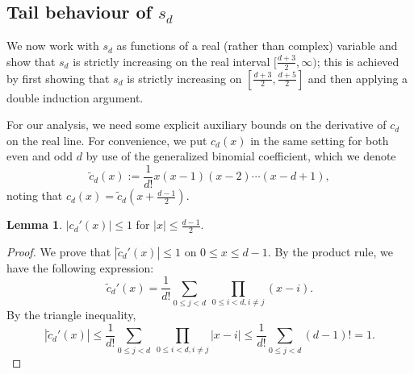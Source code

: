 \documentclass[12pt]{amsart}
\theoremstyle{definition}
\newtheorem{lemma}[theorem]{Lemma}
\begin{document}
\subsection{Tail behaviour of $s_d$}
We now work with $s_d$ as functions of a real (rather than complex) variable and show that $s_d$ is strictly increasing on the real interval $[\frac{d+3}{2},\infty)$; this is achieved by first showing that $s_d$ is strictly increasing on $[\frac{d+3}{2},\frac{d+5}{2}]$ and then applying a double induction argument.

For our analysis, we  need some explicit auxiliary bounds on the derivative of $c_d$ on the real line. For convenience, we put $c_{d}(x)$ in the same setting for both even and odd $d$ by use of the generalized binomial coefficient, which we denote 
$$ \tilde{c}_d(x):= \frac{1}{d!}x(x-1)(x-2)\cdots (x-d+1), $$
noting that $c_{d}(x) = \tilde{c}_d(x+\frac{d-1}{2})$. 

	 
 \begin{lemma}
    $|c_{d}'(x)| \leq 1 $ for $|x|\leq \frac{d-1}{2}$.
\label{lem:first_cd_derivative_bound}
\end{lemma}
\begin{proof}
    We prove that $|\tilde{c}_d'(x)| \leq  1$ on $0\leq x\leq d-1$. By the product rule, we have the following expression:
    $$ \tilde{c}_d'(x) = \frac{1}{d!}\sum_{0\leq j< d}^{}
    \ \prod_{0\leq i < d,i\neq j}^{}(x-i). $$
    By the triangle inequality,
    $$ |\tilde{c}_d'(x)| 
    \leq \frac{1}{d!}\sum_{0\leq j< d}^{}
    \ \prod_{0\leq i < d,i\neq j}^{} |x-i| 
    \leq \frac{1}{d!}\sum_{0\leq j< d}^{} (d-1)! = 1. $$
    
\end{proof}
	 
\end{document}
